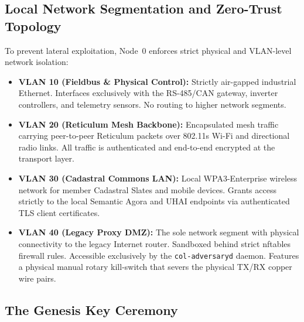 \subsection{Local Network Segmentation and Zero-Trust Topology}
\label{subsec:network_segmentation}

To prevent lateral exploitation, Node~0 enforces strict physical and VLAN-level network isolation:
\begin{itemize}
    \item \textbf{VLAN 10 (Fieldbus \& Physical Control):} Strictly air-gapped industrial Ethernet. Interfaces exclusively with the RS-485/CAN gateway, inverter controllers, and telemetry sensors. No routing to higher network segments.
    \item \textbf{VLAN 20 (Reticulum Mesh Backbone):} Encapsulated mesh traffic carrying peer-to-peer Reticulum packets over 802.11s Wi-Fi and directional radio links. All traffic is authenticated and end-to-end encrypted at the transport layer.
    \item \textbf{VLAN 30 (Cadastral Commons LAN):} Local WPA3-Enterprise wireless network for member Cadastral Slates and mobile devices. Grants access strictly to the local Semantic Agora and UHAI endpoints via authenticated TLS client certificates.
    \item \textbf{VLAN 40 (Legacy Proxy DMZ):} The sole network segment with physical connectivity to the legacy Internet router. Sandboxed behind strict nftables firewall rules. Accessible exclusively by the \texttt{col-adversaryd} daemon. Features a physical manual rotary kill-switch that severs the physical TX/RX copper wire pairs.
\end{itemize}

\subsection{The Genesis Key Ceremony}
\label{subsec:genesis_key_ceremony}

